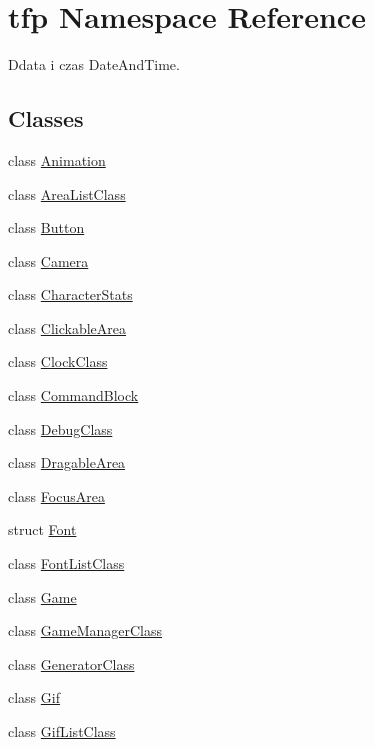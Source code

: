 \hypertarget{namespacetfp}{}\section{tfp Namespace Reference}
\label{namespacetfp}


Ddata i czas Date\+And\+Time.  


\subsection*{Classes}
\begin{DoxyCompactItemize}
\item 
class \mbox{\hyperlink{classtfp_1_1_animation}{Animation}}
\item 
class \mbox{\hyperlink{classtfp_1_1_area_list_class}{Area\+List\+Class}}
\item 
class \mbox{\hyperlink{classtfp_1_1_button}{Button}}
\item 
class \mbox{\hyperlink{classtfp_1_1_camera}{Camera}}
\item 
class \mbox{\hyperlink{classtfp_1_1_character_stats}{Character\+Stats}}
\item 
class \mbox{\hyperlink{classtfp_1_1_clickable_area}{Clickable\+Area}}
\item 
class \mbox{\hyperlink{classtfp_1_1_clock_class}{Clock\+Class}}
\item 
class \mbox{\hyperlink{classtfp_1_1_command_block}{Command\+Block}}
\item 
class \mbox{\hyperlink{classtfp_1_1_debug_class}{Debug\+Class}}
\item 
class \mbox{\hyperlink{classtfp_1_1_dragable_area}{Dragable\+Area}}
\item 
class \mbox{\hyperlink{classtfp_1_1_focus_area}{Focus\+Area}}
\item 
struct \mbox{\hyperlink{structtfp_1_1_font}{Font}}
\item 
class \mbox{\hyperlink{classtfp_1_1_font_list_class}{Font\+List\+Class}}
\item 
class \mbox{\hyperlink{classtfp_1_1_game}{Game}}
\item 
class \mbox{\hyperlink{classtfp_1_1_game_manager_class}{Game\+Manager\+Class}}
\item 
class \mbox{\hyperlink{classtfp_1_1_generator_class}{Generator\+Class}}
\item 
class \mbox{\hyperlink{classtfp_1_1_gif}{Gif}}
\item 
class \mbox{\hyperlink{classtfp_1_1_gif_list_class}{Gif\+List\+Class}}

\end{DoxyCompactItemize}
